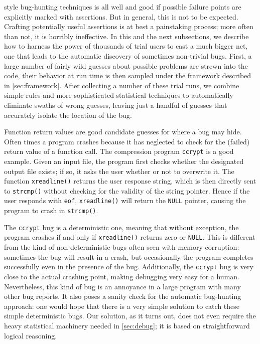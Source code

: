 \CCured style bug-hunting techniques is all well and good if possible
failure points are explicitly marked with assertions.  But in general,
this is not to be expected.  Crafting potentially useful assertions is
at best a painstaking process; more often than not, it is horribly
ineffective.  In this and the next subsections, we describe how to
harness the power of thousands of trial users to cast a much bigger
net, one that leads to the automatic discovery of sometimes
non-trivial bugs.  First, a large number of fairly wild guesses about
possible problems are strewn into the code, their behavior at run time
is then sampled under the framework described in
\autoref{sec:framework}.  After collecting a number of these trial
runs, we combine simple rules and more sophisticated statistical
techniques to automatically eliminate swaths of wrong guesses, leaving
just a handful of guesses that accurately isolate the location of the
bug.

Function return values are good candidate guesses for where a bug may
hide.  Often times a program crashes because it has neglected to check
for the (failed) return value of a function call.  The compression
program \texttt{ccrypt} is a good example.  Given an input file, the
program first checks whether the designated output file exists; if
so, it asks the user whether or not to overwrite it.  The function
\texttt{xreadline()} returns the user response string, which is then
directly sent to \texttt{strcmp()} without checking for the validity
of the string pointer.  Hence if the user responds with \texttt{eof},
\texttt{xreadline()} will return the \texttt{NULL} pointer, causing the
program to crash in \texttt{strcmp()}.

The \texttt{ccrypt} bug is a deterministic one, meaning that without
exception, the program crashes if and only if \texttt{xreadline()}
returns zero or \texttt{NULL}.  This is different from the kind of
non-deterministic bugs often seen with memory corruption: sometimes
the bug will result in a crash, but occasionally the program completes
successfully even in the presence of the bug.  Additionally, the
\texttt{ccrypt} bug is very close to the actual crashing point, making
debugging very easy for a human.  Nevertheless, this kind of bug is an
annoyance in a large program with many other bug reports.  It also
poses a sanity check for the automatic bug-hunting approach: one
would hope that there is a very simple solution to catch these
simple deterministic bugs.  Our solution, as it turns out, does not
even require the heavy statistical machinery needed in
\autoref{sec:debug}; it is based on straightforward logical
reasoning.


